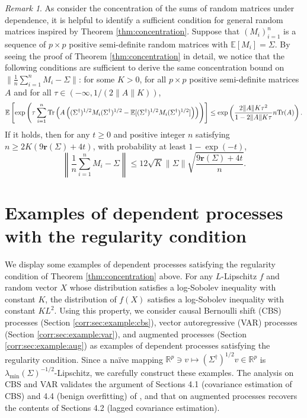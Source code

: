 \documentclass[11pt,a4paper]{article}
\theoremstyle{remark}
\newtheorem{remark}{Remark}
\theoremstyle{definition}
\newcommand{\bX}{X}
\newcommand{\bsf}{f}
\newcommand{\bv}{v}
\newcommand{\bfA}{A}
\newcommand{\bfM}{M}
\newcommand{\bSigma}{\Sigma}
\newcommand{\R}{\mathbb{R}}
\newcommand{\E}{\mathbb{E}}
\newcommand{\tr}{\textnormal{Tr}}
\newcommand{\er}{\mathbf{r}}
\theoremstyle{definition}
\begin{document}
\begin{bibunit}[apalike]
\begin{remark}\label{remark:general}
    As \citet{nakakita2024dimension} consider the concentration of the sums of random matrices under dependence, it is helpful to identify a sufficient condition for general random matrices inspired by Theorem \ref{thm:concentration}.
    Suppose that $(\bfM_{i})_{i=1}^{n}$ is a sequence of $p\times p$ positive semi-definite random matrices with $\E[\bfM_{i}]=\bSigma$. 
    By seeing the proof of Theorem \ref{thm:concentration} in detail, we notice that the following conditions are sufficient to derive the same concentration bound on $\|\frac{1}{n}\sum_{i=1}^{n}\bfM_{i}-\bSigma\|$: for some $K>0$, for all $p\times p$ positive semi-definite matrices $\bfA$ and for all $\tau\in(-\infty,1/(2\|\bfA\|K))$,
    \begin{equation}
        \E\left[\exp\left(\tau\sum_{i=1}^{n}\tr\left(\bfA\left((\bSigma^{\dagger})^{1/2}\bfM_{i}(\bSigma^{\dagger})^{1/2}-\E[(\bSigma^{\dagger})^{1/2}\bfM_{i}(\bSigma^{\dagger})^{1/2}]\right)\right)\right)\right]\le \exp\left(\frac{2\|\bfA\|K\tau^{2}}{1-2\|\bfA\|K\tau}n\tr(\bfA)\right).\label{eq:general}
    \end{equation}
    If it holds, then for any $t\ge0$ and positive integer $n$ satisfying $n\ge 2K(9\er(\bSigma)+4t)$, with probability at least $1-\exp(-t)$,
    \begin{equation*}
        \left\|\frac{1}{n}\sum_{i=1}^{n}\bfM_{i}-\bSigma\right\|\le  12\sqrt{K}\|\bSigma\|\sqrt{\frac{9\er(\bSigma)+4t}{n}}.
    \end{equation*}
\end{remark}


\section{Examples of dependent processes with the regularity condition}\label{corr:sec:example}
We display some examples of dependent processes satisfying the regularity condition of Theorem \ref{thm:concentration} above.
For any $L$-Lipschitz $\bsf$ and random vector $\bX$ whose distribution satisfies a log-Sobolev inequality with constant $K$, the distribution of $\bsf(\bX)$ satisfies a log-Sobolev inequality with constant $KL^{2}$.
Using this property, we consider causal Bernoulli shift (CBS) processes (Section \ref{corr:sec:example:cbs}), vector autoregressive (VAR) processes (Section \ref{corr:sec:example:var}), and augmented processes (Section \ref{corr:sec:example:aug}) as examples of dependent processes satisfying the regularity condition.
Since a na\"{i}ve mapping $\R^{p}\ni \bv\mapsto(\bSigma^{\dagger})^{1/2}\bv\in\R^{p}$ is $\lambda_{\min}(\bSigma)^{-1/2}$-Lipschitz, we carefully construct these examples.
The analysis on CBS and VAR validates the argument of Sections 4.1 (covariance estimation of CBS) and 4.4 (benign overfitting) of \citet{nakakita2024dimension}, and that on augmented processes recovers the contents of Sections 4.2 (lagged covariance estimation).


\end{bibunit}
\end{document}
